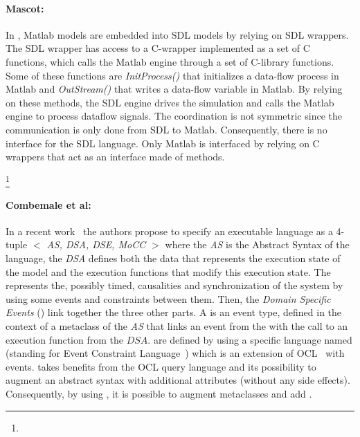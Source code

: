  
{\color{red}\paragraph{Mascot: }
In \cite{mascotbib}, Matlab models are embedded into SDL models by relying on SDL wrappers. The SDL wrapper has access to a C-wrapper implemented as a set of C functions, which calls the Matlab engine through a set of C-library functions. Some of these functions are \emph{InitProcess()} that initializes a data-flow process in Matlab and \emph{OutStream()} that writes a data-flow variable in Matlab. By relying on these methods, the SDL engine drives the simulation and calls the Matlab engine to process dataflow signals. The coordination is not symmetric since the communication is only done from SDL to Matlab. Consequently, there is no interface for the SDL language. Only Matlab is interfaced by relying on C wrappers that act as an interface made of methods.}\footnote{}



\paragraph{Combemale et al: }
In a recent work~\cite{sle13-combemale} the authors propose to specify an executable language as a 4-tuple \emph{$<$ AS, DSA, DSE, MoCC $>$} where the \emph{AS} is the Abstract Syntax of the language, the \emph{DSA} defines both the data that represents the execution state of the model and the execution functions that modify this execution state. The \mocc represents the, possibly timed, causalities and synchronization of the system by using some events and constraints between them. Then, the \emph{Domain Specific Events} (\dse) link together the three other parts. A \dse is an event type, defined in the context of a metaclass of the \emph{AS} that links an event from the \mocc with the call to an execution function from the $DSA$. \dse are defined by using a specific language named \ecl (standing for Event Constraint Language~\cite{eclbib}) which is an extension of OCL~\cite{omgocl2bib} with events. \ecl takes benefits from the OCL query language and its possibility to augment an abstract syntax with additional attributes (without any side effects). Consequently, by using \ecl, it is possible to augment \as metaclasses and add \dse. 

